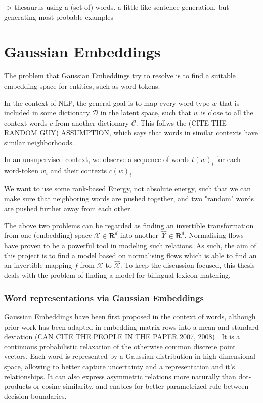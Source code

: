 \documentclass[a4paper,12pt,twoside,openright]{report}
\begin{document}
-> thesaurus using a (set of) words. a little like sentence-generation, but generating most-probable examples


\section{Gaussian Embeddings}

The problem that Gaussian Embeddings try to resolve is to find a suitable embedding space for entities, such as word-tokens.

In the context of NLP, the general goal is to map every word type $w$ that is included in some dictionary $\mathcal{D}$ in the latent space, such that $w$ is close to all the context words $c$ from another dictionary $\mathcal{C}$.
This follws the (CITE THE RANDOM GUY) ASSUMPTION, which says that words in similar contexts have similar neighborhoods.

In an unsupervised context, we observe a sequence of words ${t(w)_i}$ for each word-token $w_i$ and their contexts $c(w)_i$.

We want to use some rank-based Energy, not absolute energy, such that we can make sure that neighboring words are pushed together, and two "random" words are pushed further away from each other.

The above two problems can be regarded as finding an invertible transformation from one (embedding) space $\mathcal{X} \in \mathbf{R}^d$ into another $\mathcal{\hat{X}} \in \mathbf{R}^d$. 
Normalising flows \cite{variational_inference_using_normalized_flows} \cite{nvp} have proven to be a powerful tool in modeling such relations.
As such, the aim of this project is to find a model based on normalising flows which is able to find an an invertible mapping $f$ from $\mathcal{X}$ to $\mathcal{\hat{X}}$.
To keep the discussion focused, this thesis deals with the problem of finding a model for bilingual lexicon matching.

\subsubsection{Word representations via Gaussian Embeddings}

Gaussian Embeddings have been first proposed in the context of words, although prior work has been adapted in embedding matrix-rows into a mean and standard deviation (CAN CITE THE PEOPLE IN THE PAPER 2007, 2008) .
It is a continuous probabilistic relaxation of the otherwise common discrete point vectors.
Each word is represented by a Gaussian distribution in high-dimensional space, allowing to better capture uncertainty and a representation and it's relationships.
It can also express asymmetric relations more naturally than dot-products or cosine similarity, and enables for better-parametrized rule between decision boundaries.
\end{document}
